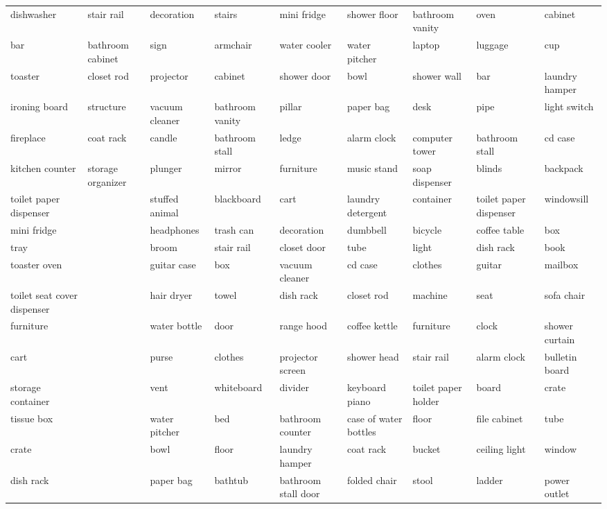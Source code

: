 \begin{table*}[!ht]
{\begin{tabular}{lll|lll|lll}
        dishwasher & stair rail & decoration & stairs & mini fridge & shower floor & bathroom vanity & oven & cabinet \\ 
        bar & bathroom cabinet & sign & armchair & water cooler & water pitcher & laptop & luggage & cup \\ 
        toaster & closet rod & projector & cabinet & shower door & bowl & shower wall & bar & laundry hamper \\ 
        ironing board & structure & vacuum cleaner & bathroom vanity & pillar & paper bag & desk & pipe & light switch \\ 
        fireplace & coat rack & candle & bathroom stall & ledge & alarm clock & computer tower & bathroom stall & cd case \\ 
        kitchen counter & storage organizer & plunger & mirror & furniture & music stand & soap dispenser & blinds & backpack \\ 
        toilet paper dispenser & ~ & stuffed animal & blackboard & cart & laundry detergent & container & toilet paper dispenser & windowsill \\ 
        mini fridge & ~ & headphones & trash can & decoration & dumbbell & bicycle & coffee table & box \\ 
        tray & ~ & broom & stair rail & closet door & tube & light & dish rack & book \\ 
        toaster oven & ~ & guitar case & box & vacuum cleaner & cd case & clothes & guitar & mailbox \\ 
        toilet seat cover dispenser & ~ & hair dryer & towel & dish rack & closet rod & machine & seat & sofa chair \\ 
        furniture & ~ & water bottle & door & range hood & coffee kettle & furniture & clock & shower curtain \\ 
        cart & ~ & purse & clothes & projector screen & shower head & stair rail & alarm clock & bulletin board \\ 
        storage container & ~ & vent & whiteboard & divider & keyboard piano & toilet paper holder & board & crate \\ 
        tissue box & ~ & water pitcher & bed & bathroom counter & case of water bottles & floor & file cabinet & tube \\ 
        crate & ~ & bowl & floor & laundry hamper & coat rack & bucket & ceiling light & window \\ 
        dish rack & ~ & paper bag & bathtub & bathroom stall door & folded chair & stool & ladder & power outlet \\ 

\end{tabular}}
\end{table*}
